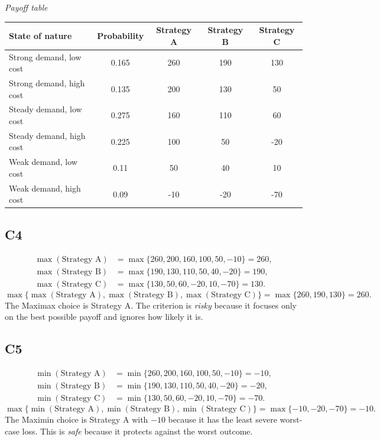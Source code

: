 \begin{ExamProblems}
\begin{center}
		\end{center}
		\begin{center}
			\textit{Payoff table} \\
			\begin{tabular}{l c c c c}
				\toprule
				State of nature & Probability & Strategy A & Strategy B & Strategy C \\
				\midrule
				Strong demand, low cost & 0.165 & 260 & 190 & 130 \\
				Strong demand, high cost & 0.135 & 200 & 130 & 50 \\
				Steady demand, low cost & 0.275 & 160 & 110 & 60 \\
				Steady demand, high cost & 0.225 & 100 & 50 & -20 \\
				Weak demand, low cost & 0.11 & 50 & 40 & 10 \\
				Weak demand, high cost & 0.09 & -10 & -20 & -70 \\
				\bottomrule
			\end{tabular}
		\end{center}

		\subsection*{C4}
		\[
		\begin{aligned}
		\max(\text{Strategy A}) &= \max\{260,200,160,100,50,-10\} = 260,\\
		\max(\text{Strategy B}) &= \max\{190,130,110,50,40,-20\} = 190,\\
		\max(\text{Strategy C}) &= \max\{130,50,60,-20,10,-70\} = 130.
		\end{aligned}
		\]
		\[
		\max\{\max(\text{Strategy A}), \max(\text{Strategy B}), \max(\text{Strategy C})\}
		= \max\{260, 190, 130\}
		= 260.
		\]
		The Maximax choice is Strategy A. The criterion is \emph{risky} because it focuses only on the best possible payoff and ignores how likely it is.

		\subsection*{C5}
		\[
		\begin{aligned}
		\min(\text{Strategy A}) &= \min\{260,200,160,100,50,-10\} = -10,\\
		\min(\text{Strategy B}) &= \min\{190,130,110,50,40,-20\} = -20,\\
		\min(\text{Strategy C}) &= \min\{130,50,60,-20,10,-70\} = -70.
		\end{aligned}
		\]
		\[
		\max\{\min(\text{Strategy A}), \min(\text{Strategy B}), \min(\text{Strategy C})\}
		= \max\{-10, -20, -70\}
		= -10.
		\]
		The Maximin choice is Strategy A with $-10$ because it has the least severe worst-case loss. This is \emph{safe} because it protects against the worst outcome.


\end{ExamProblems}

